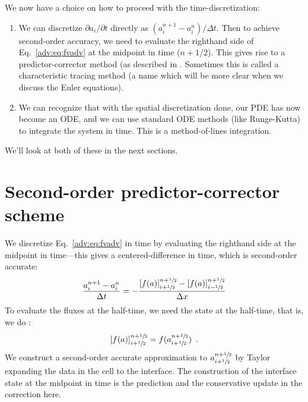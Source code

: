 We now have a choice on how to proceed with the time-discretization:
\begin{enumerate}
\item We can discretize ${\partial a_i}/{\partial t}$ directly as
  $(a_i^{n+1} - a_i^n)/\Delta t$.  Then to achieve second-order
  accuracy, we need to evaluate the righthand side of
  Eq.~\ref{adv:eq:fvadv} at the midpoint in time ($n+1/2$).  This
  gives rise to a predictor-corrector method (as described in
  \cite{colella:1990}.  Sometimes this is called a characteristic
  tracing method (a name which will be more clear when we discuss the
  Euler equations).

\item We can recognize that with the spatial discretization done, our
  PDE has now become an ODE, and we can use standard ODE methods (like
  Runge-Kutta) to integrate the system in time.  This is a method-of-lines
  integration.

\end{enumerate}

We'll look at both of these in the next sections.


\section{Second-order predictor-corrector scheme}

We discretize Eq.~\ref{adv:eq:fvadv} in time by evaluating the
righthand side at the midpoint in time---this gives a
centered-difference in time, which is second-order accurate:
\begin{equation}
\frac{a_i^{n+1} - a_i^n}{\Delta t} = -\frac{\left [f(a) \right ]_{i+{\sfrac{1}{2}}}^{n+{\sfrac{1}{2}}} - \left [f(a) \right ]_{i-{\sfrac{1}{2}}}^{n+{\sfrac{1}{2}}}}{\Delta x}
\label{eq:consupdate1d}
\end{equation}
To evaluate the fluxes at the half-time, we need the state at the
half-time, that is, we do :
\begin{equation}
\label{adv:eq:fluxeval}
\left [f(a) \right ]_{i+{\sfrac{1}{2}}}^{n+{\sfrac{1}{2}}} = f(a_{i+{\sfrac{1}{2}}}^{n+{\sfrac{1}{2}}}) \enskip .
\end{equation}
We construct a second-order accurate approximation to
$a_{i+{\sfrac{1}{2}}}^{n+{\sfrac{1}{2}}}$ by Taylor expanding the data in the cell
to the interface.  The construction of the interface state at the
midpoint in time is the prediction and the conservative update in the
correction here.

